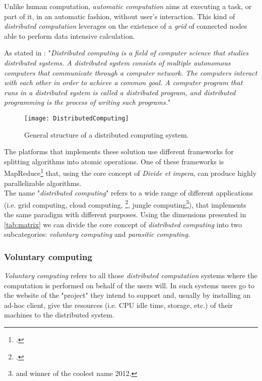 
Unlike human computation, \emph{automatic computation} aims at executing a task, or
part of it, in an automatic fashion, without user's interaction. This kind of
\emph{distributed computation} leverages on the existence of a \emph{grid} of
connected nodes able to perform data intensive calculation.


As stated in \cite{andrewsfoundations}: "\emph{Distributed
computing is a field of computer science that studies distributed systems. A
distributed system consists of multiple autonomous computers that communicate
through a computer network. The computers interact with each other in order to
achieve a common goal. A computer program that runs in a distributed system is
called a distributed program, and distributed programming is the process of
writing such programs.}"
\begin{figure}[htb]
    \centering
    \texttt{[image: DistributedComputing]}
    \caption{General structure of a distributed computing system.}
    \label{fig:distributed-computing}
\end{figure}

The platforms that implements these solution use different frameworks for splitting
algorithms into atomic operations. One of these frameworks
is MapReduce\footcite{dean2008mapreduce} that, using the core concept of
\emph{Divide et impera}, can produce highly parallelizable algorithms.\\

The name "\emph{distributed computing}" refers to a wide range of different
applications (i.e. grid computing, cloud computing,
\footcite{barabasi2001parasitic}, jungle
computing\footnote{\cite{seinstra2011jungle} and winner of the coolest name 2012.}),
that implements the same paradigm with different purposes.
Using the dimensions presented in \autoref{tab:matrix} we can divide the
core concept of \emph{distributed computing} into two subcategories: \emph{voluntary
computing} and \emph{parasitic computing}.


\subsubsection{Voluntary computing}
\label{sec:bg:crowd:auto:voluntary}
\emph{Voluntary computing} refers to all those \emph{distributed computation}
systems where the computation is performed on behalf of the users will. In such
systems users go to the website of the "project" they intend to support and, usually
by installing an ad-hoc client, give the resources (i.e. CPU idle time, storage,
etc.) of their machines to the distributed system.\\

